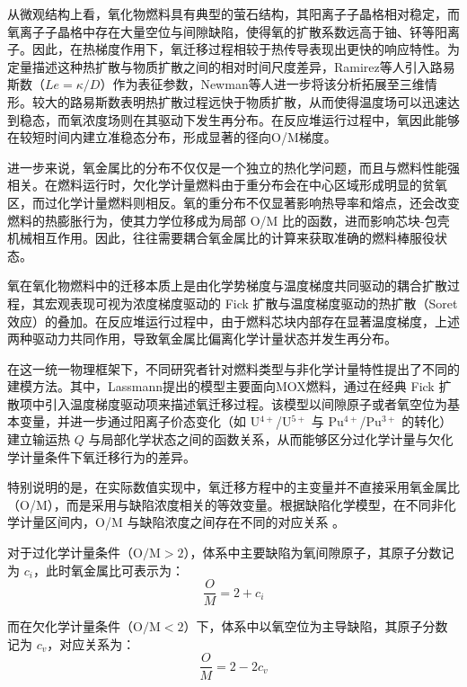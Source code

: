 从微观结构上看，氧化物燃料具有典型的萤石结构，其阳离子子晶格相对稳定，而氧离子子晶格中存在大量空位与间隙缺陷，使得氧的扩散系数远高于铀、钚等阳离子。因此，在热梯度作用下，氧迁移过程相较于热传导表现出更快的响应特性。为定量描述这种热扩散与物质扩散之间的相对时间尺度差异，Ramirez等人引入路易斯数（$Le = \kappa / D$）作为表征参数，Newman等人\cite{newmanThreeDimensionalCoupled2009}进一步将该分析拓展至三维情形。较大的路易斯数表明热扩散过程远快于物质扩散，从而使得温度场可以迅速达到稳态，而氧浓度场则在其驱动下发生再分布。在反应堆运行过程中，氧因此能够在较短时间内建立准稳态分布，形成显著的径向O/M梯度。

进一步来说，氧金属比的分布不仅仅是一个独立的热化学问题，而且与燃料性能强相关。在燃料运行时，欠化学计量燃料由于重分布会在中心区域形成明显的贫氧区，而过化学计量燃料则相反。氧的重分布不仅显著影响热导率和熔点，还会改变燃料的热膨胀行为，使其力学位移成为局部 O/M 比的函数，进而影响芯块-包壳机械相互作用。因此，往往需要耦合氧金属比的计算来获取准确的燃料棒服役状态。

氧在氧化物燃料中的迁移本质上是由化学势梯度与温度梯度共同驱动的耦合扩散过程，其宏观表现可视为浓度梯度驱动的 Fick 扩散与温度梯度驱动的热扩散（Soret 效应）的叠加。在反应堆运行过程中，由于燃料芯块内部存在显著温度梯度，上述两种驱动力共同作用，导致氧金属比偏离化学计量状态并发生再分布。

在这一统一物理框架下，不同研究者针对燃料类型与非化学计量特性提出了不同的建模方法。其中，Lassmann\cite{lassmannOxiredModelRedistribution1987}提出的模型主要面向MOX燃料，通过在经典 Fick 扩散项中引入温度梯度驱动项来描述氧迁移过程。该模型以间隙原子或者氧空位为基本变量，并进一步通过阳离子价态变化（如 U$^{4+}$/U$^{5+}$ 与 Pu$^{4+}$/Pu$^{3+}$ 的转化）建立输运热 $Q$ 与局部化学状态之间的函数关系，从而能够区分过化学计量与欠化学计量条件下氧迁移行为的差异。

特别说明的是，在实际数值实现中，氧迁移方程中的主变量并不直接采用氧金属比（O/M），而是采用与缺陷浓度相关的等效变量。根据缺陷化学模型，在不同非化学计量区间内，O/M 与缺陷浓度之间存在不同的对应关系 \cite{lassmannOxiredModelRedistribution1987}。

对于过化学计量条件（$ \mathrm{O/M} > 2 $），体系中主要缺陷为氧间隙原子，其原子分数记为 $c_i$，此时氧金属比可表示为：
\begin{equation}
	\frac{O}{M} = 2 + c_i
\end{equation}

而在欠化学计量条件（$ \mathrm{O/M} < 2 $）下，体系中以氧空位为主导缺陷，其原子分数记为 $c_v$，对应关系为：
\begin{equation}
	\frac{O}{M} = 2 - 2c_v
\end{equation}

